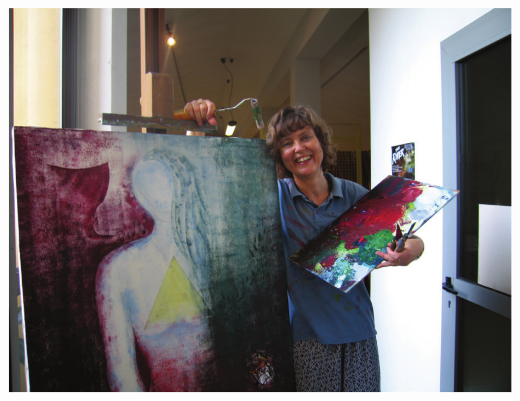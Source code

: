 \documentclass[a4paper,twoside, svgnames]{article}
\begin{document}
\begin{multicols}{2}
\begin{onehalfspacing}
\begin{justify}
\begin{center}
\includegraphics[width=\linewidth]{images/susanne}
\end{center}



        \end{justify}
     \end{onehalfspacing}
\end{multicols}
\end{document}
